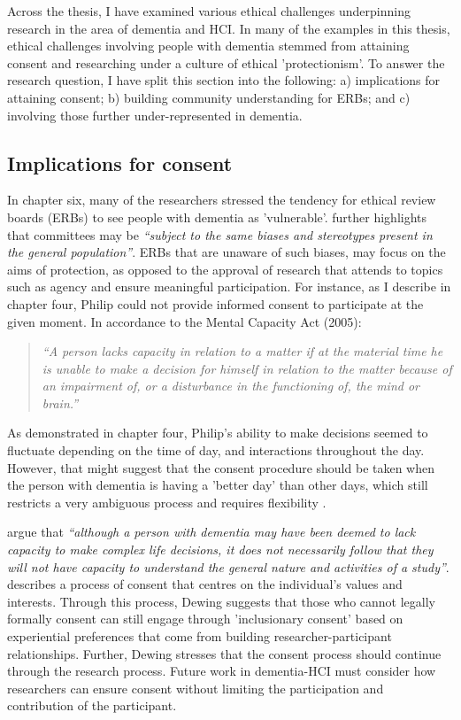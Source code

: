 Across the thesis, I have examined various ethical challenges underpinning research in the area of dementia and HCI. In many of the examples in this thesis, ethical challenges involving people with dementia stemmed from attaining consent and researching under a culture of ethical 'protectionism'. To answer the research question, I have split this section into the following: a) implications for attaining consent; b)  building community understanding for ERBs; and c) involving those further under-represented in dementia.

\subsection{Implications for consent}
\label{Cosent-Implications}
In chapter six, many of the researchers stressed the tendency for ethical review boards (ERBs) to see people with dementia as 'vulnerable'. \cite{pachana_can_2014} further highlights that committees may be \textit{``subject to the same biases and stereotypes present in the general population''}. ERBs that are unaware of such biases, may focus on the aims of protection, as opposed to the approval of research that attends to topics such as agency and ensure meaningful participation. For instance, as I describe in chapter four, Philip could not provide informed consent to participate at the given moment. In accordance to the Mental Capacity Act (2005):

\begin{quote}
\textit{``A person lacks capacity in relation to a matter if at the material time he is unable to make a decision for himself in relation to the matter because of an impairment of, or a disturbance in the functioning of, the mind or brain.''} \citep{oyebode_mental_2005}
\end{quote}

As demonstrated in chapter four, Philip's ability to make decisions seemed to fluctuate depending on the time of day, and interactions throughout the day. However, that might suggest that the consent procedure should be taken when the person with dementia is having a 'better day' than other days, which still restricts a very ambiguous process and requires flexibility \citep{trachsel2015cognitive}. 

\cite{o2021advocating} argue that \textit{``although a person with dementia may have been deemed to lack capacity to make complex life decisions, it does not necessarily follow that they will not have capacity to understand the general nature and activities of a study''}. \cite{dewing_participatory_2007} describes a process of consent that centres on the individual's values and interests. Through this process, Dewing suggests that those who cannot legally formally consent can still engage through 'inclusionary consent' based on experiential preferences that come from building researcher-participant relationships. Further, Dewing stresses that the consent process should continue through the research process. Future work in dementia-HCI must consider how researchers can ensure consent without limiting the participation and contribution of the participant. 

